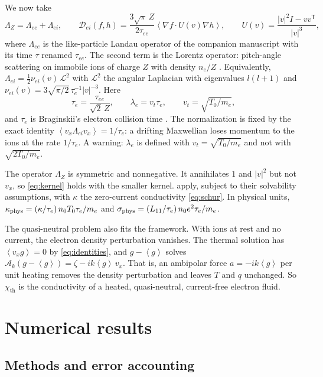 \documentclass[11pt]{article}
\newcommand{\av}[1]{\left\langle #1\right\rangle}
\newcommand{\D}{\mathcal D}
\newcommand{\A}{\mathcal A}
\newcommand{\kap}{\kappa}
\newcommand{\thr}{\mathrm{th}}
\theoremstyle{definition}
\theoremstyle{remark}
\numberwithin{equation}{section}
\begin{document}
We now take
\begin{equation}
 \Lambda_Z=\Lambda_{ee}+\Lambda_{ei},\qquad
 \D_{ei}(f,h)=\frac{3\sqrt\pi\,Z}{2\tau_{ee}}
   \av{\nabla f\cdot U(v)\nabla h},\qquad
 U(v)=\frac{|v|^2I-vv^{\mathsf T}}{|v|^3},
 \label{eq:electron}
\end{equation}
where $\Lambda_{ee}$ is the like-particle Landau operator of the
companion manuscript with its time $\tau$ renamed $\tau_{ee}$. The second
term is the Lorentz operator: pitch-angle scattering on immobile ions of
charge $Z$ with density $n_e/Z$ \cite{HelanderSigmar2002}. Equivalently,
$\Lambda_{ei}=\tfrac12\nu_{ei}(v)\,\mathcal L^2$ with $\mathcal L^2$ the
angular Laplacian with eigenvalues $l(l+1)$ and
$\nu_{ei}(v)=3\sqrt{\pi/2}\,\tau_e^{-1}|v|^{-3}$. Here
\begin{equation}
 \tau_e=\frac{\tau_{ee}}{\sqrt2\,Z},\qquad \lambda_e=v_t\tau_e,\qquad
 v_t=\sqrt{T_0/m_e},
 \label{eq:taue}
\end{equation}
and $\tau_e$ is Braginskii's electron collision time
\cite{Braginskii1965}. The normalization is fixed by the exact identity
$\av{v_x\Lambda_{ei}v_x}=1/\tau_e$: a drifting Maxwellian loses momentum
to the ions at the rate $1/\tau_e$. A warning: $\lambda_e$ is defined with
$v_t=\sqrt{T_0/m_e}$ and not with $\sqrt{2T_0/m_e}$.

The operator $\Lambda_Z$ is symmetric and nonnegative. It annihilates $1$
and $|v|^2$ but not $v_x$, so \eqref{eq:kernel} holds with the smaller
kernel.  apply, subject to their
solvability assumptions, with $\kap$ the zero-current conductivity
\eqref{eq:schur}. In physical units,
$\kap_{\rm phys}=(\kap/\tau_e)\,n_0T_0\tau_e/m_e$ and
$\sigma_{\rm phys}=(L_{11}/\tau_e)\,n_0e^2\tau_e/m_e$.

The quasi-neutral problem also fits the framework. With ions at rest and
no current, the electron density perturbation vanishes. The thermal
solution has $\av{v_xg}=0$ by \eqref{eq:identities}, and
$g-\av g$ solves $\A_k(g-\av g)=\zeta-ik\av g\,v_x$. That is, an ambipolar
force $a=-ik\av g$ per unit heating removes the density perturbation and
leaves $T$ and $q$ unchanged. So $\chi_\thr$ is the conductivity of a
heated, quasi-neutral, current-free electron fluid.

\section{Numerical results}\label{sec:numerics}

\subsection{Methods and error accounting}
\end{document}
